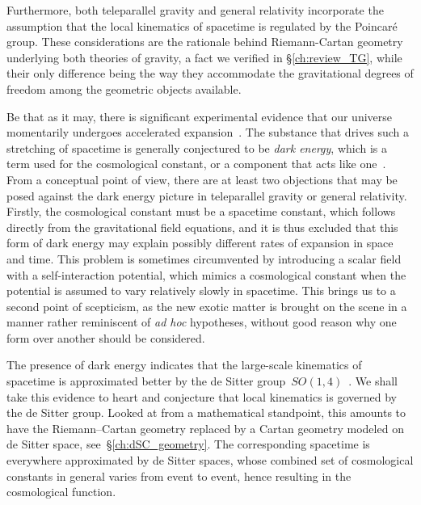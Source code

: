 \documentclass[
final,
11pt,
a4paper,
DIV=11,
headinclude=true,
footinclude=false,
bibliography=totoc,
twoside=true,  %
BCOR=5mm
]{scrbook}
\begin{document}
Furthermore, both teleparallel gravity and general relativity 
incorporate the assumption that the local kinematics of spacetime 
is regulated by the Poincar\'e group. These considerations are 
the rationale behind Riemann-Cartan geometry underlying both 
theories of gravity, a fact we verified in \S\ref{ch:review_TG}, 
while their only difference being the way they accommodate the 
gravitational degrees of freedom among the geometric objects 
available.  

Be that as it may, there is significant experimental evidence 
that our universe momentarily undergoes accelerated 
expansion~\cite{Peebles:2003cc, Weinberg:2008bc}. The substance 
that drives such a stretching of spacetime is generally 
conjectured to be \emph{dark energy}, which is a term used for 
the cosmological constant, or a component that acts like 
one~\cite{Peebles:2003cc}. From a conceptual point of view, there 
are at least two objections that may be posed against the dark 
energy picture in teleparallel gravity or general relativity.  
Firstly, the cosmological constant must be a spacetime constant, 
which follows directly from the gravitational field equations, 
and it is thus excluded that this form of dark energy may explain 
possibly different rates of expansion in space and time. This 
problem is sometimes circumvented by introducing a scalar field 
with a self-interaction potential, which mimics a cosmological 
constant when the potential is assumed to vary relatively slowly 
in spacetime.  This brings us to a second point of scepticism, as 
the new exotic matter is brought on the scene in a manner rather 
reminiscent of \emph{ad hoc} hypotheses, without good reason why 
one form over another should be considered.

The presence of dark energy indicates that the large-scale 
kinematics of spacetime is approximated better by the de Sitter 
group~$SO(1,4)$~\cite{Aldrovandi:2006vr}. We shall take this 
evidence to heart and conjecture that local kinematics is 
governed by the de Sitter group. Looked at from a mathematical 
standpoint, this amounts to have the Riemann--Cartan geometry 
replaced by a Cartan geometry modeled on de Sitter space, 
see~\S\ref{ch:dSC_geometry}. The corresponding spacetime is 
everywhere approximated by de Sitter spaces, whose combined set 
of cosmological constants in general varies from event to event, 
hence resulting in the cosmological function.
\end{document}
